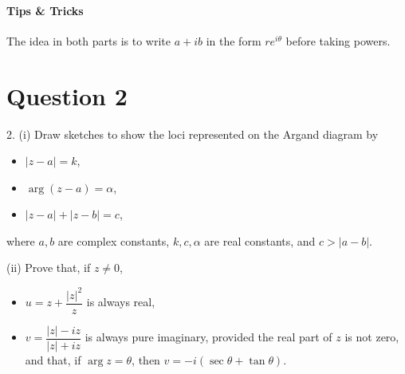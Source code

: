 \documentclass[11pt,a4paper]{report}
\theoremstyle{plain}
\theoremstyle{definition}
\begin{document}
\bigskip

\paragraph{Tips \& Tricks} The idea in both parts is to write $ a + ib $ in the form $ re^{i\theta} $ before taking powers.


\newpage
\section*{Question 2}

2. (i) Draw sketches to show the loci represented on the Argand diagram by
 
\begin{itemize} [nosep]
\item [(a)] $ |z-a| = k $,
\item [(b)] $ \arg (z-a) = \alpha $,
\item [(c)] $ |z-a| + |z-b| = c $,
\end{itemize} 
 where $ a , b $ are complex  constants, $ k,c, \alpha $ are real constants, and $ c > |a-b |$. 

\medskip
\phantom{2.}(ii) Prove that, if $ z \neq 0 $,
\begin{itemize} [nosep]
\item [(a)] $ u = z + \dfrac{|z|^2}{z} $ is always real,
\item [(b)] $ v = \dfrac{|z|- iz }{|z| + i z } $ is always pure imaginary, provided the real part of $ z $ is not zero, and that, if $ \arg z = \theta $, then $ 
v = -i(\sec \theta + \tan \theta)
$. 
\end{itemize} 

\bigskip
\end{document}

